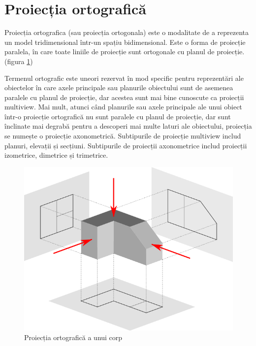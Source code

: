 \newpage
\section{Proiecția ortografică}

Proiecția ortografica (sau proiecția ortogonala) este o modalitate de a reprezenta un model tridimensional  
într-un spațiu bidimensional. Este o forma de proiecție paralela, în care toate liniile de proiecție sunt ortogonale 
cu planul de proiecție. (figura \ref{fig:proj})\newline

Termenul ortografic este uneori rezervat în mod specific pentru reprezentări ale obiectelor în care axele principale 
sau planurile obiectului sunt de asemenea paralele cu planul de proiecție, dar acestea sunt mai bine cunoscute 
ca proiecții multiview. Mai mult, atunci când planurile sau axele principale ale unui obiect într-o proiecție 
ortografică nu sunt paralele cu planul de proiecție, dar sunt înclinate mai degrabă pentru a descoperi mai 
multe laturi ale obiectului, proiecția se numește o proiecție axonometrică. Subtipurile de proiecție multiview 
includ planuri, elevații și secțiuni. Subtipurile de proiecții axonometrice includ proiecții izometrice, dimetrice și trimetrice. \newline

\begin{figure}[H]
  \begin{center}
      \includegraphics[scale=0.5]{imagini/proiectie/ortografica.png}
      \caption{Proiecția ortografică a unui corp \protect\footnotemark}
      \label{fig:proj}
  \end{center}    
\end{figure}

